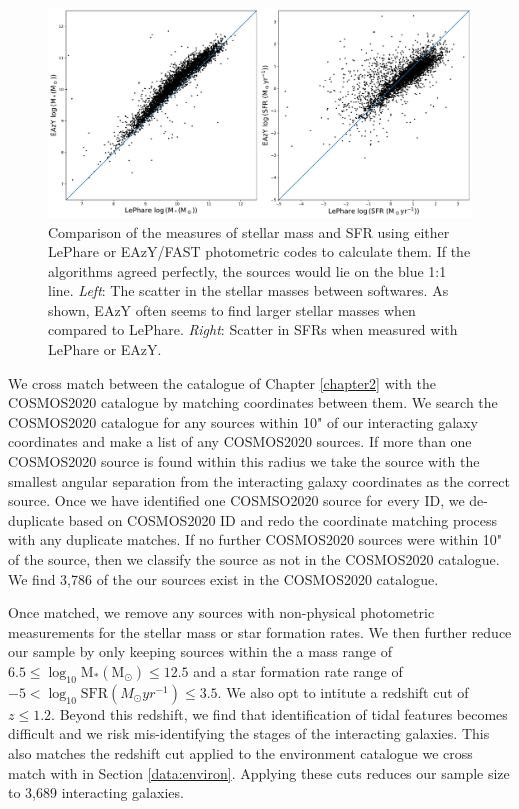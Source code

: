 \begin{figure}
    \centering
    \includegraphics[width=\textwidth]{Chapter3/figures/mass-sfr-scatter.pdf}
    \caption[Comparison of the measures of stellar mass and SFR using either LePhare or EAzY/FAST photometric codes to calculate them.]{Comparison of the measures of stellar mass and SFR using either LePhare or EAzY/FAST photometric codes to calculate them. If the algorithms agreed perfectly, the sources would lie on the blue 1:1 line. \textit{Left}: The scatter in the stellar masses between softwares. As shown, EAzY often seems to find larger stellar masses when compared to LePhare. \textit{Right}: Scatter in SFRs when measured with LePhare or EAzY.}
    \label{fig:difference-measures}
\end{figure}

We cross match between the catalogue of Chapter \ref{chapter2} with the COSMOS2020 catalogue by matching coordinates between them. We search the COSMOS2020 catalogue for any sources within 10" of our interacting galaxy coordinates and make a list of any COSMOS2020 sources. If more than one COSMOS2020 source is found within this radius we take the source with the smallest angular separation from the interacting galaxy coordinates as the correct source. Once we have identified one COSMSO2020 source for every ID, we de-duplicate based on COSMOS2020 ID and redo the coordinate matching process with any duplicate matches. If no further COSMOS2020 sources were within 10" of the source, then we classify the source as not in the COSMOS2020 catalogue. We find 3,786 of the our sources exist in the COSMOS2020 catalogue.

Once matched, we remove any sources with non-physical photometric measurements for the stellar mass or star formation rates. We then further reduce our sample by only keeping sources within the a mass range of $6.5 \leq \log_{10} \text{M}_{*}(\text{M}_{\odot}) \leq 12.5$ and a star formation rate range of $-5 < \log_{10} \text{SFR} (M_{\odot}yr^{-1}) \leq 3.5$. We also opt to intitute a redshift cut of $z \leq 1.2$. Beyond this redshift, we find that identification of tidal features becomes difficult and we risk mis-identifying the stages of the interacting galaxies. This also matches the redshift cut applied to the environment catalogue we cross match with in Section \ref{data:environ}. Applying these cuts reduces our sample size to 3,689 interacting galaxies.

